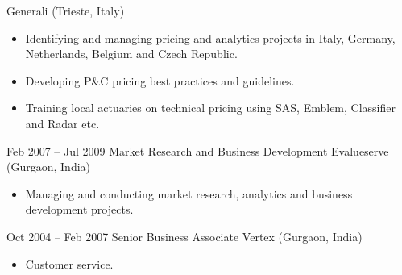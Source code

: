 \documentclass[a4paper,]{fortysecondscv}
\begin{document}
\begin{cvtable}
			{Generali (Trieste, Italy)}
			{
				\vspace{-\topsep}
				\begin{itemize}[nosep, leftmargin=0pt] %
					\item Identifying and managing pricing and analytics projects in Italy, Germany, Netherlands, Belgium and Czech Republic.
					\item Developing P\&C pricing best practices and guidelines.
					\item Training local actuaries on technical pricing using SAS, Emblem, Classifier and Radar etc.
				\end{itemize}
			}
        \vspace{\topsep}
		\cvitem
			{Feb 2007 -- Jul 2009}
			{Market Research and Business Development}
			{Evalueserve (Gurgaon, India)}
			{
				\begin{itemize}[nosep, leftmargin=0pt] %
					\item Managing and conducting market research, analytics and business development projects.
				\end{itemize}
			}
	\end{cvtable}





\newpage
\makebacksidebar

	\begin{cvtable}%

        \vspace{\topsep}
		\cvitem
			{Oct 2004 -- Feb 2007}
			{Senior Business Associate}
			{Vertex (Gurgaon, India)}
			{
				\vspace{-\topsep}
				\begin{itemize}[nosep, leftmargin=0pt] %
					\item Customer service.
				\end{itemize}
			}

    \end{cvtable}
\end{document}
